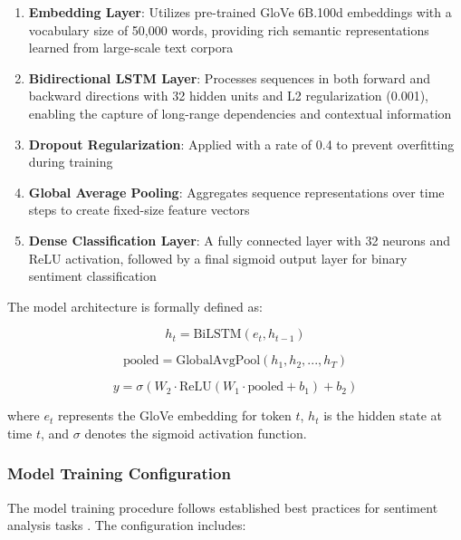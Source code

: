 \documentclass[../main.tex]{subfiles}
\begin{document}
\begin{enumerate}
\item \textbf{Embedding Layer}: Utilizes pre-trained GloVe 6B.100d embeddings with a vocabulary size of 50,000 words, providing rich semantic representations learned from large-scale text corpora \cite{li2022glove}
\item \textbf{Bidirectional LSTM Layer}: Processes sequences in both forward and backward directions with 32 hidden units and L2 regularization (0.001), enabling the capture of long-range dependencies and contextual information \cite{kumar2023amc}
\item \textbf{Dropout Regularization}: Applied with a rate of 0.4 to prevent overfitting during training
\item \textbf{Global Average Pooling}: Aggregates sequence representations over time steps to create fixed-size feature vectors
\item \textbf{Dense Classification Layer}: A fully connected layer with 32 neurons and ReLU activation, followed by a final sigmoid output layer for binary sentiment classification \cite{pimpalkar2022mblstmglove}
\end{enumerate}

The model architecture is formally defined as:

\begin{equation}
h_t = \text{BiLSTM}(e_t, h_{t-1})
\end{equation}

\begin{equation}
\text{pooled} = \text{GlobalAvgPool}(h_1, h_2, ..., h_T)
\end{equation}

\begin{equation}
y = \sigma(W_2 \cdot \text{ReLU}(W_1 \cdot \text{pooled} + b_1) + b_2)
\end{equation}

where $e_t$ represents the GloVe embedding for token $t$, $h_t$ is the hidden state at time $t$, and $\sigma$ denotes the sigmoid activation function.


\subsubsection{Model Training Configuration}

The model training procedure follows established best practices for sentiment analysis tasks \cite{li2022glove}. The configuration includes:
\end{document}
